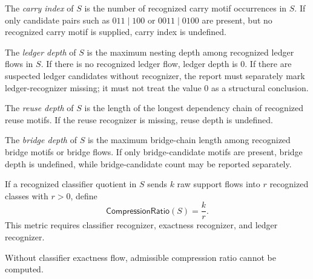 \begin{definition}
\label{def:metric-report-carry-index}
The \emph{carry index} of $S$ is the number of recognized carry motif occurrences in $S$. If only candidate pairs such as $011\mid 100$ or $0011\mid 0100$ are present, but no recognized carry motif is supplied, carry index is undefined.
\end{definition}

\begin{definition}
\label{def:metric-report-ledger-depth}
The \emph{ledger depth} of $S$ is the maximum nesting depth among recognized ledger flows in $S$. If there is no recognized ledger flow, ledger depth is $0$. If there are suspected ledger candidates without recognizer, the report must separately mark ledger-recognizer missing; it must not treat the value $0$ as a structural conclusion.
\end{definition}

\begin{definition}
\label{def:metric-report-reuse-depth}
The \emph{reuse depth} of $S$ is the length of the longest dependency chain of recognized reuse motifs. If the reuse recognizer is missing, reuse depth is undefined.
\end{definition}

\begin{definition}
\label{def:metric-report-bridge-depth}
The \emph{bridge depth} of $S$ is the maximum bridge-chain length among recognized bridge motifs or bridge flows. If only bridge-candidate motifs are present, bridge depth is undefined, while bridge-candidate count may be reported separately.
\end{definition}

\begin{definition}
\label{def:metric-report-compression-ratio}
If a recognized classifier quotient in $S$ sends $k$ raw support flows into $r$ recognized classes with $r>0$, define
$$
  \mathsf{CompressionRatio}(S)=\frac{k}{r}.
$$
This metric requires classifier recognizer, exactness recognizer, and ledger recognizer.
\end{definition}

\begin{proposition}
\label{prop:metric-report-compression-requires-exactness}
Without classifier exactness flow, admissible compression ratio cannot be computed.
\end{proposition}

